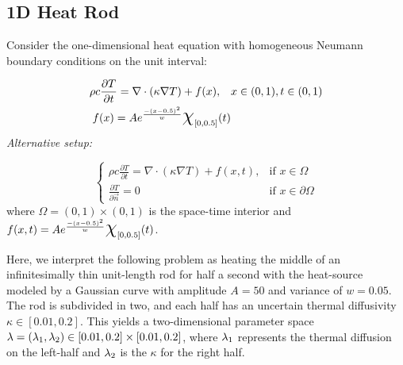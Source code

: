 \subsection{1D Heat Rod}\label{ex:heat-set-sample}

Consider the one-dimensional heat equation with homogeneous Neumann boundary conditions on the unit interval:

\begin{equation}
\begin{split}
\rho c \frac{\partial T}{\partial t} = \nabla \cdot ( \kappa \nabla T) + f(x), \quad & x\in (0,1), t\in (0,1) \\
f(x) = A e^\frac{- (x-0.5)^2}{w} \Chi_{[0,0.5]}(t)
\end{split}
\end{equation}
\emph{Alternative setup: }

\begin{equation}
\begin{cases}
\rho c \frac{\partial T}{\partial t} = \nabla \cdot ( \kappa \nabla T) + f(x,t), & \text{if } x\in \Omega \\
\frac{\partial T}{\partial \vec{n}} = 0 & \text{if } x\in \partial \Omega
\end{cases}
\end{equation}
where $\Omega = (0,1)\times (0,1)$ is the space-time interior and $f(x,t) = A e^\frac{- (x-0.5)^2}{w} \Chi_{[0,0.5]}(t)$.

Here, we interpret the following problem as heating the middle of an infinitesimally thin unit-length rod for half a second with the heat-source modeled by a Gaussian curve with amplitude $A=50$ and variance of $w=0.05$.
The rod is subdivided in two, and each half has an uncertain thermal diffusivity $\kappa \in [0.01, 0.2]$.
This yields a two-dimensional parameter space $\lambda = (\lambda_1, \lambda_2) \in [0.01, 0.2]\times [0.01, 0.2]$, where $\lambda_1$ represents the thermal diffusion on the left-half and $\lambda_2$ is the $\kappa$ for the right half.

